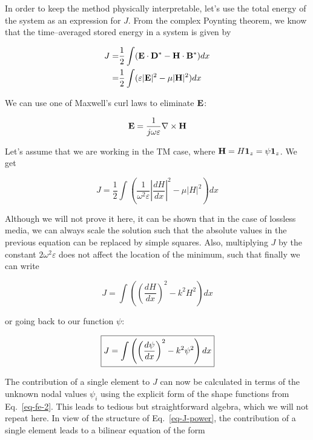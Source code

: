 In order to keep the method physically interpretable, let's use the total energy of the system as an expression for $J$. From the complex Poynting theorem, we know that the time--averaged stored energy in a system is given by

\begin{align}
J =& \frac{1}{2} \int ( {\bf E} \cdot {\bf D}^* - {\bf H} \cdot {\bf B}^* ) dx \\
  =& \frac{1}{2} \int ( \varepsilon |{\bf E}|^2 - \mu |{\bf H}|^2 ) dx
\end{align} 

We can use one of Maxwell's curl laws to eliminate ${\bf E}$:

\begin{equation}
{\bf E} = \frac{1}{j \omega \varepsilon} \nabla \times {\bf H}
\end{equation}  

Let's assume that we are working in the TM case, where ${\bf H} = H {\bf 1}_z = \psi {\bf 1}_z $. We get

\begin{equation}
J = \frac{1}{2} \int \left( \frac{1}{\omega ^2 \varepsilon}\left|{\frac{d H}{d x}}\right|^2 - \mu |H|^2 \right) dx
\end{equation}

Although we will not prove it here, it can be shown that in the case of lossless media, we can always scale the solution such that the absolute values in the previous equation can be replaced by simple squares. Also, multiplying $J$ by the constant $2 \omega ^2 \varepsilon$ does not affect the location of the minimum, such that finally we can write

\begin{equation}
J = \int \left( \left(\frac{d H}{d x}\right)^2 - k^2 H^2 \right) dx
\end{equation}

or going back to our function $\psi$:

\begin{equation}
\fbox{$\displaystyle
J = \int \left( \left(\frac{d \psi}{d x}\right)^2 - k^2 \psi^2 \right) dx \label{eq-J-power}
$}
\end{equation} 

The contribution of a single element to $J$ can now be calculated in terms of the unknown nodal values $\psi_i$ using the explicit form of the shape functions from Eq.~\ref{eq-fe-2}. This leads to tedious but straightforward algebra, which we will not repeat here. In view of the structure of Eq.~\ref{eq-J-power}, the contribution of a single element leads to a bilinear equation of the form


